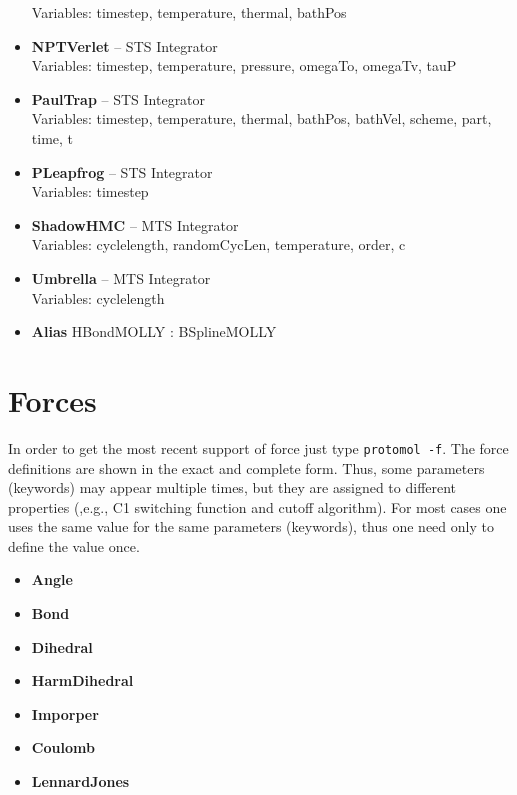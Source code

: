 \documentclass{article}
\begin{document}
\begin{itemize}
Variables:
    timestep,           
    temperature,        
    thermal,            
    bathPos            
\item \textbf{NPTVerlet} -- STS Integrator\\
Variables:
    timestep,           
    temperature,        
    pressure,           
    omegaTo,            
    omegaTv,            
    tauP               
\item \textbf{PaulTrap} -- STS Integrator\\
Variables:
    timestep,           
    temperature,        
    thermal,            
    bathPos,            
    bathVel,            
    scheme,             
    part,               
    time,               
    t                  
\item \textbf{PLeapfrog} -- STS Integrator\\
Variables:
    timestep           
\item \textbf{ShadowHMC} -- MTS Integrator\\
Variables:
    cyclelength,        
    randomCycLen,       
    temperature,        
    order,             
    c                  
\item \textbf{Umbrella} -- MTS Integrator\\
Variables:
    cyclelength        
\item \textbf{Alias}
HBondMOLLY : BSplineMOLLY 
\end{itemize}

\section{Forces}
In order to get the most recent support of force just type
\texttt{protomol -f}. The force definitions are shown in the exact and
complete form. Thus, some parameters (keywords) may appear multiple times, but
they are assigned to different properties (,e.g., C1 switching function
and cutoff algorithm). For most cases one uses the same value for the
same parameters (keywords), thus one need only to define the value once. 
\begin{itemize}
\item \textbf{Angle}
\item \textbf{Bond}
\item \textbf{Dihedral}
\item \textbf{HarmDihedral}
\item \textbf{Imporper}
\end{itemize}

\begin{itemize}
\item \textbf{Coulomb}
\item \textbf{LennardJones}
\end{itemize}
\end{document}

